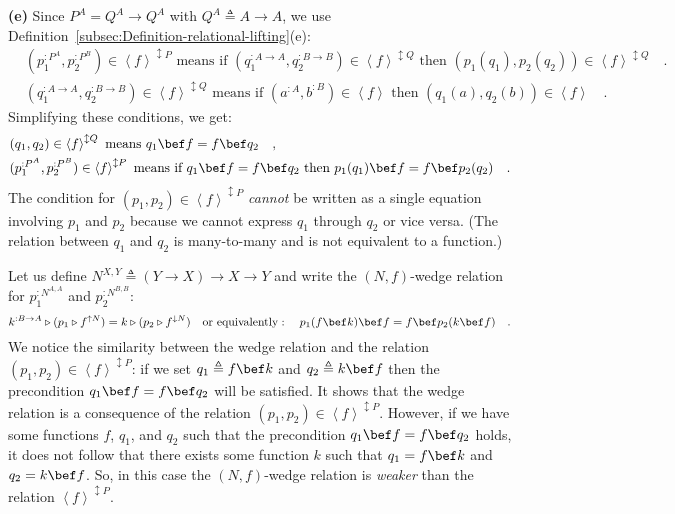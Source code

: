 \textbf{(e)} Since $P^{A}=Q^{A}\rightarrow Q^{A}$ with $Q^{A}\triangleq A\rightarrow A$,
we use Definition~\ref{subsec:Definition-relational-lifting}(e):
\begin{align*}
 & (p_{1}^{:P^{A}},p_{2}^{:P^{B}})\in\left<f\right>^{\updownarrow P}\text{ means if }(q_{1}^{:A\rightarrow A},q_{2}^{:B\rightarrow B})\in\left<f\right>^{\updownarrow Q}\text{ then }(p_{1}(q_{1}),p_{2}(q_{2}))\in\left<f\right>^{\updownarrow Q}\quad.\\
 & (q_{1}^{:A\rightarrow A},q_{2}^{:B\rightarrow B})\in\left<f\right>^{\updownarrow Q}\text{ means if }(a^{:A},b^{:B})\in\left<f\right>\text{ then }(q_{1}(a),q_{2}(b))\in\left<f\right>\quad.
\end{align*}
Simplifying these conditions, we get:
\begin{align*}
 & (q_{1},q_{2})\in\left<f\right>^{\updownarrow Q}\text{ means }q_{1}\bef f=f\bef q_{2}\quad,\\
 & (p_{1}^{:P^{A}},p_{2}^{:P^{B}})\in\left<f\right>^{\updownarrow P}\text{ means if }q_{1}\bef f=f\bef q_{2}\text{ then }p_{1}(q_{1})\bef f=f\bef p_{2}(q_{2})\quad.
\end{align*}
The condition for $(p_{1},p_{2})\in\left<f\right>^{\updownarrow P}$
\emph{cannot} be written as a single equation involving $p_{1}$ and
$p_{2}$ because we cannot express $q_{1}$ through $q_{2}$ or vice
versa. (The relation between $q_{1}$ and $q_{2}$ is many-to-many
and is not equivalent to a function.)

Let us define $N^{X,Y}\triangleq\left(Y\rightarrow X\right)\rightarrow X\rightarrow Y$
and write the $\left(N,f\right)$-wedge relation for $p_{1}^{:N^{A,A}}$
and $p_{2}^{:N^{B,B}}$:
\[
k^{:B\rightarrow A}\triangleright(p_{1}\triangleright f^{\uparrow N})=k\triangleright(p_{2}\triangleright f^{\downarrow N})\quad\text{or equivalently}:\quad p_{1}(f\bef k)\bef f=f\bef p_{2}(k\bef f)\quad.
\]
We notice the similarity between the wedge relation and the relation
$(p_{1},p_{2})\in\left<f\right>^{\updownarrow P}$: if we set $q_{1}\triangleq f\bef k$
and $q_{2}\triangleq k\bef f$ then the precondition $q_{1}\bef f=f\bef q_{2}$
will be satisfied. It shows that the wedge relation is a consequence
of the relation $(p_{1},p_{2})\in\left<f\right>^{\updownarrow P}$.
However, if we have some functions $f$, $q_{1}$, and $q_{2}$ such
that the precondition $q_{1}\bef f=f\bef q_{2}$ holds, it does not
follow that there exists some function $k$ such that $q_{1}=f\bef k$
and $q_{2}=k\bef f$. So, in this case the $\left(N,f\right)$-wedge
relation is\emph{ weaker} than the relation $\left<f\right>^{\updownarrow P}$.

